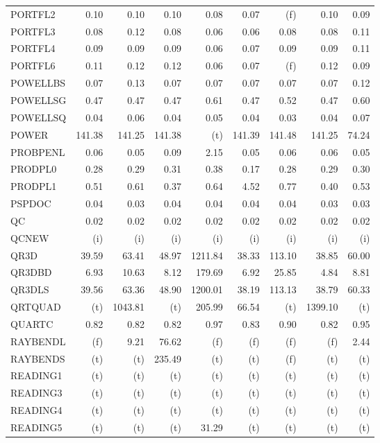 \documentclass[11pt,twoside]{article}
\begin{document}
{\begin{longtable}[c]{|l|r|r|r|r|r|r|r|r|}
PORTFL2 & 0.10 & 0.10 & 0.10 & 0.08 & 0.07 & (f) & 0.10 & 0.09 \\
PORTFL3 & 0.08 & 0.12 & 0.08 & 0.06 & 0.06 & 0.08 & 0.08 & 0.11 \\
PORTFL4 & 0.09 & 0.09 & 0.09 & 0.06 & 0.07 & 0.09 & 0.09 & 0.11 \\
PORTFL6 & 0.11 & 0.12 & 0.12 & 0.06 & 0.07 & (f) & 0.12 & 0.09 \\
POWELLBS & 0.07 & 0.13 & 0.07 & 0.07 & 0.07 & 0.07 & 0.07 & 0.12 \\
POWELLSG & 0.47 & 0.47 & 0.47 & 0.61 & 0.47 & 0.52 & 0.47 & 0.60 \\
POWELLSQ & 0.04 & 0.06 & 0.04 & 0.05 & 0.04 & 0.03 & 0.04 & 0.07 \\
POWER & 141.38 & 141.25 & 141.38 & (t) & 141.39 & 141.48 & 141.25 & 74.24 \\
PROBPENL & 0.06 & 0.05 & 0.09 & 2.15 & 0.05 & 0.06 & 0.06 & 0.05 \\
PRODPL0 & 0.28 & 0.29 & 0.31 & 0.38 & 0.17 & 0.28 & 0.29 & 0.30 \\
PRODPL1 & 0.51 & 0.61 & 0.37 & 0.64 & 4.52 & 0.77 & 0.40 & 0.53 \\
PSPDOC & 0.04 & 0.03 & 0.04 & 0.04 & 0.04 & 0.04 & 0.03 & 0.03 \\
QC & 0.02 & 0.02 & 0.02 & 0.02 & 0.02 & 0.02 & 0.02 & 0.02 \\
QCNEW & (i) & (i) & (i) & (i) & (i) & (i) & (i) & (i) \\
QR3D & 39.59 & 63.41 & 48.97 & 1211.84 & 38.33 & 113.10 & 38.85 & 60.00 \\
QR3DBD & 6.93 & 10.63 & 8.12 & 179.69 & 6.92 & 25.85 & 4.84 & 8.81 \\
QR3DLS & 39.56 & 63.36 & 48.90 & 1200.01 & 38.19 & 113.13 & 38.79 & 60.33 \\
QRTQUAD & (t) & 1043.81 & (t) & 205.99 & 66.54 & (t) & 1399.10 & (t) \\
QUARTC & 0.82 & 0.82 & 0.82 & 0.97 & 0.83 & 0.90 & 0.82 & 0.95 \\
RAYBENDL & (f) & 9.21 & 76.62 & (f) & (f) & (f) & (f) & 2.44 \\
RAYBENDS & (t) & (t) & 235.49 & (t) & (t) & (f) & (t) & (t) \\
READING1 & (t) & (t) & (t) & (t) & (t) & (t) & (t) & (t) \\
READING3 & (t) & (t) & (t) & (t) & (t) & (t) & (t) & (t) \\
READING4 & (t) & (t) & (t) & (t) & (t) & (t) & (t) & (t) \\
READING5 & (t) & (t) & (t) & 31.29 & (t) & (t) & (t) & (t) \\

\end{longtable}}
\end{document}
